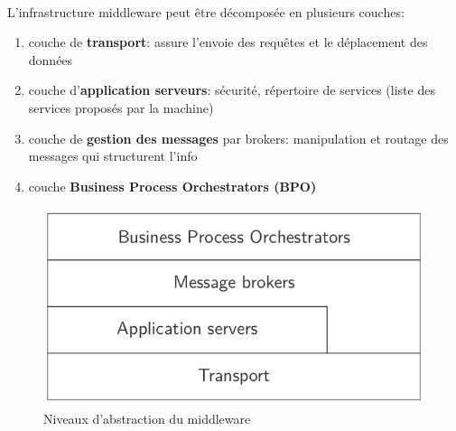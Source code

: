 {\paragraph{}
L'infrastructure middleware peut être décomposée en plusieurs couches:
\begin{enumerate}
\item couche de \textbf{transport}: assure l'envoie des requêtes et le déplacement des données
\item couche d'\textbf{application serveurs}: sécurité, répertoire de services (liste des services proposés par la machine)
\item couche de \textbf{gestion des messages} par brokers: manipulation et routage des messages qui structurent l'info
\item couche \textbf{Business Process Orchestrators (BPO)} 
\end{enumerate}
\begin{figure}[h!]
\center\includegraphics[scale=.3]{images/couches-middleware}
\caption{Niveaux d'abstraction du middleware}
\end{figure}

}

